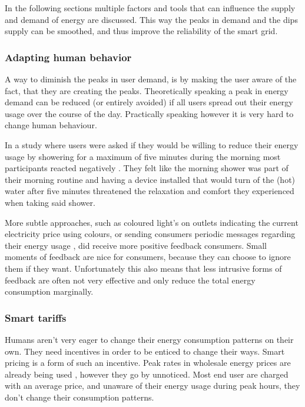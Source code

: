 In the following sections multiple factors and tools that can influence the supply and demand of energy are discussed. This way the peaks in demand and the dips supply can be smoothed, and thus improve the reliability of the smart grid.

\subsubsection{Adapting human behavior}

A way to diminish the peaks in user demand, is by making the user aware of the fact, that they are creating the peaks. Theoretically speaking a peak in energy demand can be reduced (or entirely avoided) if all users spread out their energy usage over the course of the day. Practically speaking however it is very hard to change human behaviour.

In a study where users were asked if they would be willing to reduce their energy usage by showering for a maximum of five minutes during the morning most participants reacted negatively \cite{GouldenBedwellRennick-EgglestoneEtAl2014}. They felt like the morning shower was part of their morning routine and having a device installed that would turn of the (hot) water after five minutes threatened the relaxation and comfort they experienced when taking said shower. 

More subtle approaches, such as coloured light's on outlets indicating the current electricity price using colours, or sending consumers periodic messages regarding their energy usage \cite{AyresRasemanShih2012}, did receive more positive feedback consumers. Small moments of feedback are nice for consumers, because they can choose to ignore them if they want. Unfortunately this also means that less intrusive forms of feedback are often not very effective and only reduce the total energy consumption marginally.

\subsubsection{Smart tariffs}

Humans aren’t very eager to change their energy consumption patterns on their own. They need incentives in order to be enticed to change their ways. Smart pricing is a form of such an incentive. Peak rates in wholesale energy prices are already being used \cite{SamadiMohsenian-RadSchoberEtAl2012}, however they go by unnoticed. Most end user are charged with an average price, and unaware of their energy usage during peak hours, they don’t change their consumption patterns. 

